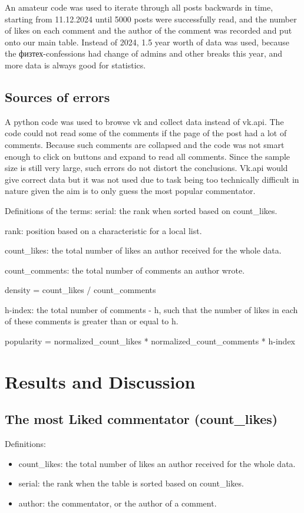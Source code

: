 \documentclass[
	11pt
] {article}
\begin{document}
		An amateur code \cite{code-scrape-py} was used to iterate through all posts backwards in time, starting from 11.12.2024 until 5000 posts were successfully read, and the number of likes on each comment and the author of the comment was recorded and put onto our main table. Instead of 2024, 1.5 year worth of data was used, because the физтех-confessions had change of admins and other breaks this year, and more data is always good for statistics.


	\subsection{Sources of errors}
		A python code was used to browse vk and collect data instead of vk.api. The code could not read some of the comments if the page of the post had a lot of comments. Because such comments are collapsed and the code was not smart enough to click on buttons and expand to read all comments. Since the sample size is still very large, such errors do not distort the conclusions. Vk.api would give correct data but it was not used due to task being too technically difficult in nature given the aim is to only guess the most popular commentator.


	Definitions of the terms:
		serial: the rank when sorted based on count\_likes.

		rank: position based on a characteristic for a local list.

		count\_likes: the total number of likes an author received for the whole data.

		count\_comments: the total number of comments an author wrote.

		density = count\_likes / count\_comments

		h-index: the total number  of comments - h, such that the number of likes in each of these comments is greater than or equal to h.

		popularity = normalized\_count\_likes * normalized\_count\_comments * h-index


\section{Results and Discussion}
\subsection{The most Liked commentator (count\_likes)}
	Definitions:
	\begin{itemize}
		\item count\_likes: the total number of likes an author received for the whole data.
		\item serial: the rank when the table is sorted based on count\_likes.
		\item author: the commentator, or the author of a comment.
	\end{itemize}
\end{document}
